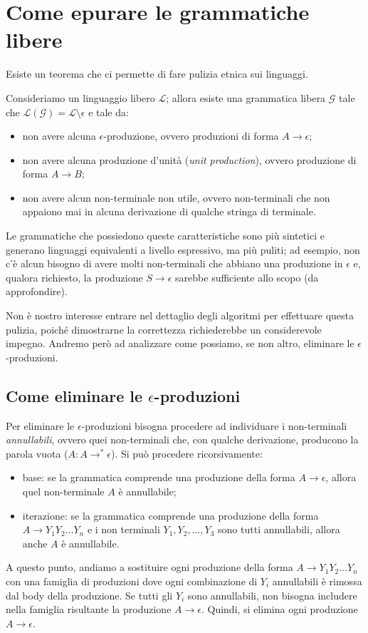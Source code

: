 \documentclass[class=book, crop=false, oneside, 12pt]{standalone}
\begin{document}
\section{Come epurare le grammatiche libere}
Esiste un teorema che ci permette di fare pulizia etnica sui linguaggi.
\begin{theorem}
  Consideriamo un linguaggio libero \(\mathcal{L}\); allora esiste una grammatica libera \(\mathcal{G}\) tale che \(\mathcal{L(G)} = \mathcal{L}\setminus\epsilon\) e tale da:
  \begin{itemize}
    \item non avere alcuna \(\epsilon\)-produzione, ovvero produzioni di forma \(A \rightarrow \epsilon\);
    \item non avere alcuna produzione d'unità (\emph{unit production}), ovvero produzione di forma \(A \rightarrow B\);
    \item non avere alcun non-terminale non utile, ovvero non-terminali che non appaiono mai in alcuna derivazione di qualche stringa di terminale.
  \end{itemize}
\end{theorem}

Le grammatiche che possiedono queste caratteristiche sono più sintetici e generano linguaggi equivalenti a livello espressivo, ma più puliti; ad esempio, non c'è alcun bisogno di avere molti non-terminali che abbiano una produzione in \(\epsilon\) e, qualora richiesto, la produzione \(S \rightarrow \epsilon\) sarebbe sufficiente allo scopo (da approfondire).

Non è nostro interesse entrare nel dettaglio degli algoritmi per effettuare questa pulizia, poiché dimostrarne la correttezza richiederebbe un considerevole impegno. Andremo però ad analizzare come possiamo, se non altro,  eliminare le \(\epsilon\)-produzioni.

\subsection{Come eliminare le \(\epsilon\)-produzioni}
Per eliminare le \(\epsilon\)-produzioni bisogna procedere ad individuare i non-terminali \emph{annullabili}, ovvero quei non-terminali che, con qualche derivazione, producono la parola vuota (\(A : A \rightarrow^* \epsilon\)). Si può procedere ricorsivamente:
\begin{itemize}
  \item base: se la grammatica comprende una produzione della forma \(A \rightarrow \epsilon\), allora quel non-terminale \(A\) è annullabile;
  \item iterazione: se la grammatica comprende una produzione della forma \(A \rightarrow Y_1Y_2 \ldots Y_n\) e i non terminali \(Y_1, Y_2, \ldots, Y_3\) sono tutti annullabili, allora anche \(A\) è annullabile.
\end{itemize}
A questo punto, andiamo a sostituire ogni produzione della forma \(A \rightarrow Y_1Y_2 \ldots Y_n\) con una famiglia di produzioni dove ogni combinazione di \(Y_i\) annullabili è rimossa dal body della produzione. Se tutti gli \(Y_i\) sono annullabili, non bisogna includere nella famiglia risultante la produzione \(A \rightarrow \epsilon\). Quindi, si elimina ogni produzione \(A \rightarrow \epsilon\).
\end{document}
